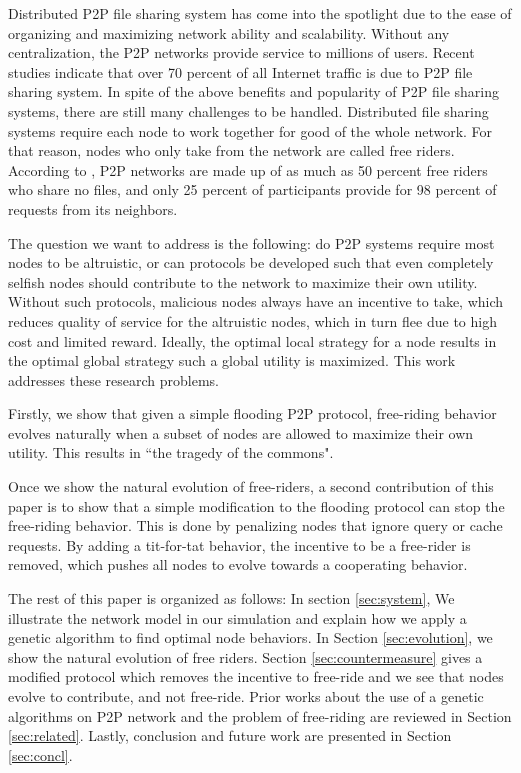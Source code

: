 \documentclass[12pt,journal,draftcls,letterpaper,onecolumn]{IEEEtran}
\begin{document}
Distributed P2P file sharing system has come into the spotlight due to the
ease of organizing and maximizing network ability and scalability.  Without any
centralization, the P2P networks provide service to millions of
users\cite{gnutella,bittorrent}.
Recent studies indicate that over
70 percent of all Internet traffic is due to P2P file sharing system. In spite of the above benefits
and popularity of P2P file sharing systems, there are still many challenges to be handled.
Distributed file sharing systems require each node to work together for good of the
whole network. For that reason, nodes who only take from the network are called free riders.
According to \cite{journals/dsonline/HughesCW05}, P2P
networks are made up of as much as 50 percent free riders who share no files, and
only 25 percent of participants provide for 98
percent of requests from its neighbors.

The question we want to address is the following: do P2P systems require most nodes 
to be altruistic, or can protocols be developed such that even completely
selfish nodes should contribute to the network to maximize their own utility.
Without such protocols, malicious nodes always have an incentive to take,
which reduces quality of service for the altruistic nodes, which in turn flee
due to high cost and limited reward.  Ideally, the optimal local strategy for
a node results in the optimal global strategy such a global utility is
maximized.  This work addresses these research problems.

Firstly, we show that given a simple flooding P2P protocol,
free-riding behavior evolves naturally when a subset of nodes are allowed to
maximize their own utility.  
This results in ``the tragedy of the commons"\cite{tc:tragedy}.

Once we show the natural evolution of free-riders, a second
contribution of this paper is to show that a simple modification
to the flooding protocol can stop the
free-riding behavior.  This is done by penalizing nodes that ignore
query or cache requests.  By adding a tit-for-tat
behavior, the incentive to be a free-rider is removed, which pushes all
nodes to evolve towards a cooperating behavior.

The rest of this paper is organized as follows: In section \ref{sec:system}, We illustrate the network model 
in our simulation and explain how we apply a genetic algorithm to find optimal
node behaviors. In Section \ref{sec:evolution}, 
we show the natural evolution of free riders.  Section
\ref{sec:countermeasure} gives a modified protocol which removes the
incentive to free-ride and we see that nodes evolve to contribute, and
not free-ride.
Prior works about the use of a genetic algorithms on P2P network and the
problem of free-riding are reviewed in Section \ref{sec:related}. Lastly,
conclusion and future work are presented in Section \ref{sec:concl}.
\end{document}
